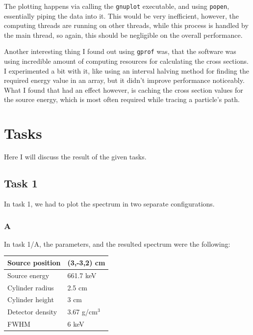 \documentclass[a4paper,12pt]{article}
\begin{document}
The plotting happens via calling the \texttt{gnuplot} executable, and using \texttt{popen}, essentially piping the data into it. This would be very inefficient, however, the computing threads are running on other threads, while this process is handled by the main thread, so again, this should be negligible on the overall performance.

Another interesting thing I found out using \texttt{gprof} was, that the software was using incredible amount of computing resources for calculating the cross sections. I experimented a bit with it, like using an interval halving method for finding the required energy value in an array, but it didn't improve performance noticeably. What I found that had an effect however, is caching the cross section values for the source energy, which is most often required while tracing a particle's path.

\section{Tasks}
Here I will discuss the result of the given tasks.
\subsection{Task 1}
In task 1, we had to plot the spectrum in two separate configurations.
\subsubsection{A}
In task 1/A, the parameters, and the resulted spectrum were the following:
\begin{table}[h!]
\centering
\begin{tabular}{|l|l|}
\hline
Source position & (3,-3,2) cm \\ \hline
Source energy & 661.7 keV \\ \hline
Cylinder radius & 2.5 cm \\ \hline
Cylinder height & 3 cm \\ \hline
Detector density & 3.67 g/cm$^3$ \\ \hline
FWHM & 6 keV \\ \hline
\end{tabular}
\end{table}
\end{document}
